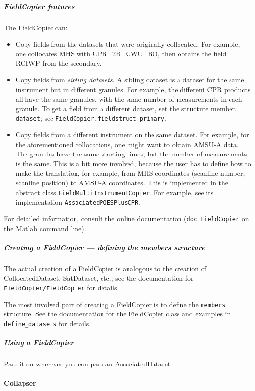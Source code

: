 \documentclass[a4paper,10pt]{article}
\begin{document}
\subparagraph{FieldCopier features}

The FieldCopier can:

\begin{itemize}
\item Copy fields from the datasets that were originally collocated.
For example, one collocates MHS with CPR\_2B\_CWC\_RO, then obtains the
field ROIWP from the secondary.
\item Copy fields from \emph{sibling datasets}.
A sibling dataset is a dataset for the same instrument but in different
granules.
For example, the different CPR products all have the same granules, with
the same number of measurements in each granule.
To get a field from a different dataset, set the structure member.
\lstinline|dataset|; see \lstinline|FieldCopier.fieldstruct_primary|.
\item Copy fields from a different instrument on the same dataset.
For example, for the aforementioned collocations, one might want to obtain
AMSU-A data.
The granules have the same starting times, but the number of measurements
is the same.
This is a bit more involved, because the user has to define how to make
the translation, for example, from MHS coordinates (scanline number,
scanline position) to AMSU-A coordinates.
This is implemented in the abstract class
\lstinline|FieldMultiInstrumentCopier|.
For example, see its implementation \lstinline|AssociatedPOESPlusCPR|.
\end{itemize}

For detailed information, consult the online documentation
(\lstinline|doc FieldCopier| on the Matlab command line).

\subparagraph{Creating a FieldCopier --- defining the members structure}

The actual creation of a FieldCopier is analogous to the creation of
CollocatedDataset, SatDataset, etc.; see the documentation for
\lstinline|FieldCopier/FieldCopier| for details.

The most involved part of creating a FieldCopier is to define the
\lstinline|members| structure.
See the documentation for the FieldCopier class and examples in
\lstinline|define_datasets| for details.

\subparagraph{Using a FieldCopier}

Pass it on wherever you can pass an AssociatedDataset

\paragraph{Collapser}
\end{document}
